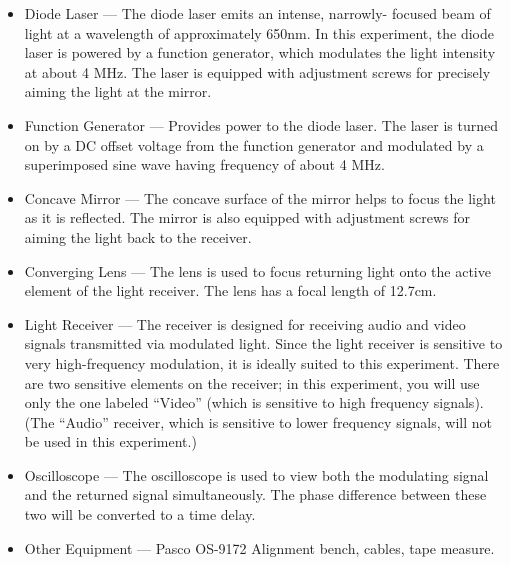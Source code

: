 \documentclass[11pt]{article}
\begin{document}

\begin{itemize}
  
\item Diode Laser — The diode laser emits an intense, narrowly- focused beam of
light at a wavelength of approximately 650nm. In this experiment, the diode
laser is powered by a function generator, which modulates the light intensity at
about 4 MHz. The laser is equipped with adjustment screws for precisely aiming
the light at the mirror.

\item Function Generator — Provides power to the diode laser. The laser is
turned on by a DC offset voltage from the function generator and modulated by a
superimposed sine wave having frequency of about 4 MHz.

\item Concave Mirror — The concave surface of the mirror helps to focus the
light as it is reflected. The mirror is also equipped with adjustment screws for
aiming the light back to the receiver.

\item Converging Lens — The lens is used to focus returning light onto the
active element of the light receiver. The lens has a focal length of 12.7cm.

\item Light Receiver — The receiver is designed for receiving audio and video
signals transmitted via modulated light. Since the light receiver is sensitive
to very high-frequency modulation, it is ideally suited to this experiment.
There are two sensitive elements on the receiver; in this experiment, you will
use only the one labeled “Video” (which is sensitive to high frequency signals).
(The “Audio” receiver, which is sensitive to lower frequency signals, will not
be used in this experiment.)

\item Oscilloscope — The oscilloscope is used to view both the modulating signal
and the returned signal simultaneously. The phase difference between these two
will be converted to a time delay.

\item Other Equipment — Pasco OS-9172 Alignment bench, cables, tape measure.
\end{itemize}

\vspace{5mm}

\end{document}
